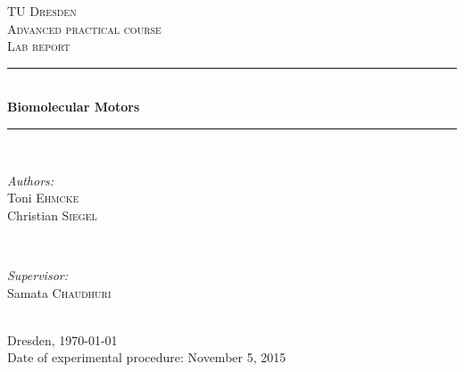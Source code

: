 \begin{titlepage}
\newcommand{\HRule}{\rule{\linewidth}{0.5mm}} %

\center %
 

\textsc{\LARGE TU Dresden}\\[1.5cm] %
\textsc{\Large Advanced practical course}\\[0.5cm] %
\textsc{\Large Lab report}\\[0.5cm] %


\HRule \\[0.7cm]
{ \huge \bfseries Biomolecular Motors}\\[0.4cm] %
\HRule \\[1.5cm]
 

\begin{minipage}{0.4\textwidth}
\begin{flushleft} \large
\emph{Authors:}\\
Toni \textsc{Ehmcke}\\
Christian \textsc{Siegel}
\end{flushleft}
\end{minipage}
~
\begin{minipage}{0.4\textwidth}
\begin{flushright} \large
\emph{Supervisor:} \\
Samata \textsc{Chaudhuri} %
\end{flushright}
\end{minipage}\\[4cm]


{\large Dresden, \today}\\ %
{\large Date of experimental procedure: November 5, 2015}\\[3cm]


\vfill 

\end{titlepage}